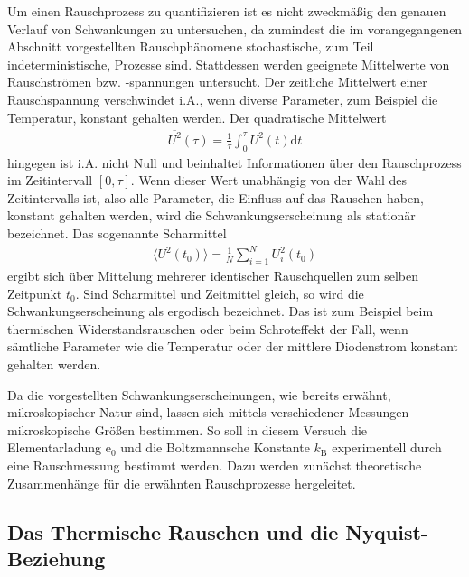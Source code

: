 Um einen Rauschprozess zu quantifizieren ist es nicht zweckmäßig den genauen Verlauf
von Schwankungen zu untersuchen, da zumindest die im vorangegangenen Abschnitt vorgestellten
Rauschphänomene stochastische, zum Teil indeterministische, Prozesse sind. Stattdessen
werden geeignete Mittelwerte von Rauschströmen bzw. -spannungen untersucht.
Der zeitliche Mittelwert einer Rauschspannung verschwindet i.A., wenn diverse Parameter, zum Beispiel
die Temperatur, konstant gehalten werden. Der quadratische Mittelwert
\begin{align}
  \overline{U^2}(\tau) = \frac1{\tau} \int_{0}^{\tau} U^2(t) \mathrm{d}t
\end{align}
hingegen ist i.A. nicht Null und beinhaltet Informationen über den Rauschprozess im Zeitintervall $[0,\tau]$. Wenn dieser Wert
unabhängig von der Wahl des Zeitintervalls ist, also alle Parameter, die Einfluss auf das Rauschen haben, konstant
gehalten werden, wird die Schwankungserscheinung als stationär bezeichnet.
Das sogenannte Scharmittel
\begin{align}
  \langle U^2(t_0) \rangle = \frac1{N} \sum_{i=1}^{N} U_i^2(t_0)
\end{align}
ergibt sich über Mittelung mehrerer identischer Rauschquellen zum selben Zeitpunkt $t_0$.
Sind Scharmittel und Zeitmittel gleich, so wird die Schwankungserscheinung als ergodisch bezeichnet.
Das ist zum Beispiel beim thermischen Widerstandsrauschen oder beim Schroteffekt der Fall, wenn sämtliche
Parameter wie die Temperatur oder der mittlere Diodenstrom konstant gehalten werden.

Da die vorgestellten Schwankungserscheinungen, wie bereits erwähnt, mikroskopischer Natur sind,
lassen sich mittels verschiedener Messungen mikroskopische Größen bestimmen. So soll in diesem
Versuch die Elementarladung $\mathrm{e}_0$ und die Boltzmannsche Konstante $k_\text{B}$ experimentell durch eine
Rauschmessung bestimmt werden. Dazu werden zunächst theoretische Zusammenhänge für die erwähnten Rauschprozesse hergeleitet.

\subsection{Das Thermische Rauschen und die Nyquist-Beziehung}

